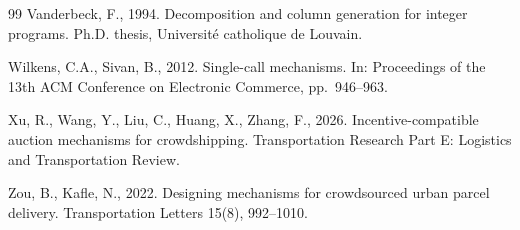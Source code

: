 \documentclass[review,12pt]{elsarticle}
\theoremstyle{definition}
\theoremstyle{remark}
\begin{document}
\begin{thebibliography}{99}
Vanderbeck, F., 1994. Decomposition and column generation for integer
programs. Ph.D. thesis, Universit{\'e} catholique de Louvain.

Wilkens, C.A., Sivan, B., 2012. Single-call mechanisms. In: Proceedings of
the 13th ACM Conference on Electronic Commerce, pp.~946--963.

Xu, R., Wang, Y., Liu, C., Huang, X., Zhang, F., 2026. Incentive-compatible
auction mechanisms for crowdshipping. Transportation Research Part E:
Logistics and Transportation Review. %

Zou, B., Kafle, N., 2022. Designing mechanisms for crowdsourced urban parcel
delivery. Transportation Letters 15(8), 992--1010. %

\end{thebibliography}
\end{document}
